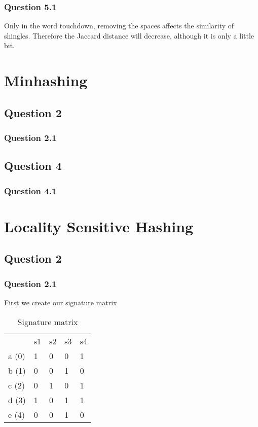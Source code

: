 \documentclass[11pt,twoside,a4paper]{article}
\begin{document}
	\subsection{Question 5.1}
		Only in the word touchdown, removing the spaces affects the similarity of shingles. Therefore the Jaccard distance will decrease, although it is only a little bit. 
		
\chapter{Minhashing}

\section{Question 2}

	\subsection{Question 2.1}
	
\section{Question 4}

 	\subsection{Question 4.1}
 	
 \chapter{Locality Sensitive Hashing}
 
 \section{Question 2}
 
 	\subsection{Question 2.1}
 	First we create our signature matrix
 	
 	\begin{table}[h!]
	\centering
	\label{my-label}
	\begin{tabular}{lllll}
	 & s1 & s2 & s3 & s4 \\
	 a (0) & 1 & 0 & 0 & 1 \\
	 b (1) & 0 & 0 & 1 & 0 \\
	 c (2) & 0 & 1 & 0 & 1 \\
	 d (3) & 1 & 0 & 1 & 1 \\
	 e (4) & 0 & 0 & 1 & 0   
	\end{tabular}
	\caption{Signature matrix}
	\end{table}
	
\end{document}
